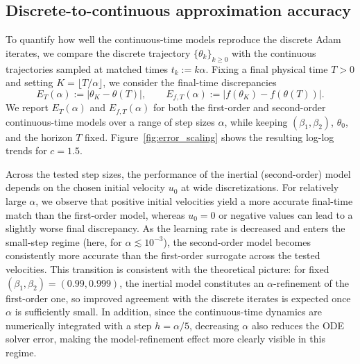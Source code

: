 \documentclass{article} %
\begin{document}
\subsection{Discrete-to-continuous approximation accuracy}
To quantify how well the continuous-time models reproduce the discrete Adam iterates, we compare the discrete trajectory $\{\theta_k\}_{k\ge 0}$ with the continuous trajectories sampled at matched times $t_k := k\alpha$. Fixing a final physical time $T>0$ and setting $K=\lfloor T/\alpha\rfloor$, we consider the final-time discrepancies
\[
E_T(\alpha) := \bigl|\theta_K - \theta(T)\bigr|,
\qquad
E_{f,T}(\alpha) := \bigl|f(\theta_K) - f(\theta(T))\bigr|.
\]
We report $E_T(\alpha)$ and $E_{f,T}(\alpha)$ for both the first-order and second-order continuous-time models over a range of step sizes $\alpha$, while keeping $(\beta_1,\beta_2)$, $\theta_0$, and the horizon $T$ fixed. Figure~\ref{fig:error_scaling} shows the resulting log-log trends for $c=1.5$.

Across the tested step sizes, the performance of the inertial (second-order) model depends on the chosen initial velocity $u_0$ at wide discretizations. For relatively large $\alpha$, we observe that positive initial velocities yield a more accurate final-time match than the first-order model, whereas $u_0=0$ or negative values can lead to a slightly worse final discrepancy. As the learning rate is decreased and enters the small-step regime (here, for $\alpha\lesssim 10^{-3}$), the second-order model becomes consistently more accurate than the first-order surrogate across the tested velocities. This transition is consistent with the theoretical picture: for fixed $(\beta_1,\beta_2) = (0.99,0.999)$, the inertial model constitutes an $\alpha$-refinement of the first-order one, so improved agreement with the discrete iterates is expected once $\alpha$ is sufficiently small. In addition, since the continuous-time dynamics are numerically integrated with a step $h=\alpha/5$, decreasing $\alpha$ also reduces the ODE solver error, making the model-refinement effect more clearly visible in this regime.
\end{document}
